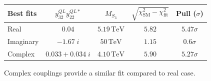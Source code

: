 \documentclass[mathserif, 10pt, dvipsnames]{beamer}
\begin{document}
\begin{frame}
    \begin{table}
        \centering
\begin{tabular}{|l|c|c|c|c|}\hline
\textbf{Best fits}   & $y^{QL}_{32} y^{QL*}_{22}$                        & $M_{S_3}$
& $\sqrt{\chi^2_\mathrm{SM} - \chi^2_\mathrm{fit}}$ & Pull ($\sigma$)      \\\hline
Real                 & $ 0.04 $                                          &
$5.19\,\mathrm{TeV}$ & $5.82$                                            & \alert{$5.47\sigma$} \\\hline
Imaginary            & $-1.67\;i$                                        &
$50\,\mathrm{TeV}$   & $1.15$                                            & \alert{$0.6\sigma$}  \\\hline
Complex              & $0.033+0.034\;i$                                  &
$4.10\,\mathrm{TeV}$ & $5.90$                                            & \alert{$5.27\sigma$} \\\hline
        \end{tabular}
    \end{table}

Complex couplings provide a similar fit compared to real case.

\end{frame}
\end{document}
